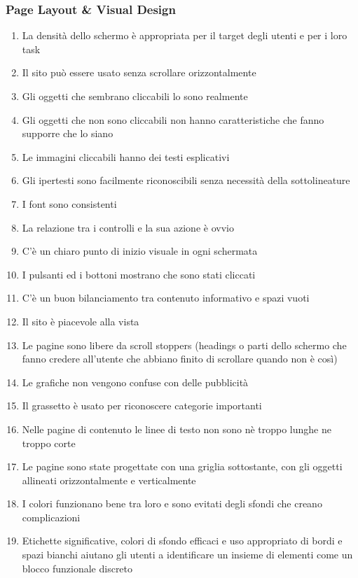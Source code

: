 \documentclass[../Report.tex]{subfiles}
\begin{document}
    \subsubsection{Page Layout \& Visual Design}
    \begin{enumerate}
        \item La densità dello schermo è appropriata per il target degli utenti e per i loro task 
        \item Il sito può essere usato senza scrollare orizzontalmente
        \item Gli oggetti che sembrano cliccabili lo sono realmente
        \item Gli oggetti che non sono cliccabili non hanno caratteristiche che fanno supporre che lo siano 
        \item Le immagini cliccabili hanno dei testi esplicativi
        \item Gli ipertesti sono facilmente riconoscibili senza necessità della sottolineature
        \item I font sono consistenti 
        \item La relazione tra i controlli e la sua azione è ovvio 
        \item C’è un chiaro punto di inizio visuale in ogni schermata 
        \item I pulsanti ed i bottoni mostrano che sono stati cliccati 
        \item C’è un buon bilanciamento tra contenuto informativo e spazi vuoti 
        \item Il sito è piacevole alla vista
        \item Le pagine sono libere da scroll stoppers (headings o parti dello schermo che fanno credere all’utente che abbiano finito di scrollare quando non è così)
        \item Le grafiche non vengono confuse con delle pubblicità
        \item Il grassetto è usato per riconoscere categorie importanti
        \item Nelle pagine di contenuto le linee di testo non sono nè troppo lunghe ne troppo corte
        \item Le pagine sono state progettate con una griglia sottostante, con gli oggetti allineati orizzontalmente e verticalmente
        \item I colori funzionano bene tra loro e sono evitati degli sfondi che creano complicazioni
        \item Etichette significative, colori di sfondo efficaci e uso appropriato di bordi e spazi bianchi aiutano gli utenti a identificare un insieme di elementi come un blocco funzionale discreto

\end{enumerate}
\end{document}

